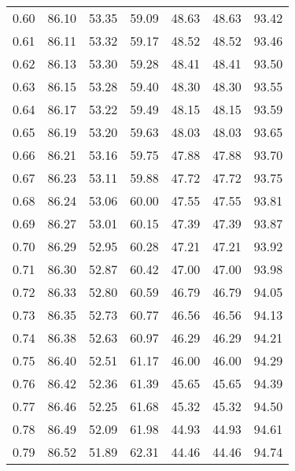 \begin{tabular}{|c|c|c|c|c|c|c|}
      0.60 &     86.10 &     53.35 &      59.09 &   48.63 &      48.63 &         93.42 \\
      0.61 &     86.11 &     53.32 &      59.17 &   48.52 &      48.52 &         93.46 \\
      0.62 &     86.13 &     53.30 &      59.28 &   48.41 &      48.41 &         93.50 \\
      0.63 &     86.15 &     53.28 &      59.40 &   48.30 &      48.30 &         93.55 \\
      0.64 &     86.17 &     53.22 &      59.49 &   48.15 &      48.15 &         93.59 \\
      0.65 &     86.19 &     53.20 &      59.63 &   48.03 &      48.03 &         93.65 \\
      0.66 &     86.21 &     53.16 &      59.75 &   47.88 &      47.88 &         93.70 \\
      0.67 &     86.23 &     53.11 &      59.88 &   47.72 &      47.72 &         93.75 \\
      0.68 &     86.24 &     53.06 &      60.00 &   47.55 &      47.55 &         93.81 \\
      0.69 &     86.27 &     53.01 &      60.15 &   47.39 &      47.39 &         93.87 \\
      0.70 &     86.29 &     52.95 &      60.28 &   47.21 &      47.21 &         93.92 \\
      0.71 &     86.30 &     52.87 &      60.42 &   47.00 &      47.00 &         93.98 \\
      0.72 &     86.33 &     52.80 &      60.59 &   46.79 &      46.79 &         94.05 \\
      0.73 &     86.35 &     52.73 &      60.77 &   46.56 &      46.56 &         94.13 \\
      0.74 &     86.38 &     52.63 &      60.97 &   46.29 &      46.29 &         94.21 \\
      0.75 &     86.40 &     52.51 &      61.17 &   46.00 &      46.00 &         94.29 \\
      0.76 &     86.42 &     52.36 &      61.39 &   45.65 &      45.65 &         94.39 \\
      0.77 &     86.46 &     52.25 &      61.68 &   45.32 &      45.32 &         94.50 \\
      0.78 &     86.49 &     52.09 &      61.98 &   44.93 &      44.93 &         94.61 \\
      0.79 &     86.52 &     51.89 &      62.31 &   44.46 &      44.46 &         94.74 \\

\end{tabular}
